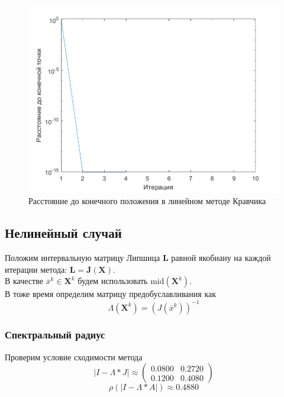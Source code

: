 \begin{figure}[H]
\centering
\includegraphics[width=\textwidth]{Graphics/Linear_dist_to_end.png}
\caption{Расстояние до конечного положения в линейном методе Кравчика} 
\end{figure}
\subsection{Нелинейный случай}
Положим интервальную матрицу Липшица $\textbf{L}$ равной якобиану на каждой итерации метода: $\textbf{L}=\textbf{J}(\textbf{X})$.\\
В качестве $\overline{x}^k\in\textbf{X}^k$ будем использовать $\mathrm{mid}(\textbf{X}^k)$.\\
В тоже время определим матрицу предобуславливания как
\begin{equation}
\Lambda(\textbf{X}^k)=(J(\overline{x}^k))^{-1}
\end{equation}
\subsubsection{Спектральный радиус}
Проверим условие сходимости метода 
\begin{equation}
    |I-\Lambda*J|\approx
    \begin{pmatrix}
0.0800  &  0.2720 \\
0.1200  &  0.4080
\end{pmatrix}
\end{equation}
\begin{equation}
     \rho(|I-\Lambda*A|)\approx0.4880
\end{equation}
